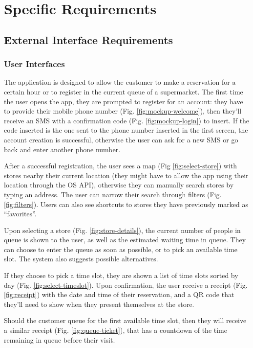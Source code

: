 \section{Specific Requirements}\label{sec:spec_req}

\subsection{External Interface Requirements}
\subsubsection{User Interfaces}

The application is designed to allow the customer to make a reservation for a certain hour or to register in the current queue of a supermarket. The first time the user opens the app, they are prompted to register for an account: they have to provide their mobile phone number
(Fig. \ref{fig:mockup-welcome}), then they'll receive an SMS with a confirmation code
(Fig. \ref{fig:mockup-login}) to insert.
If the code inserted is the one sent to the phone number inserted in the first screen, the account creation is successful, otherwise the user can ask for a new SMS or go back and enter another phone number.

After a successful registration, the user sees a map (Fig \ref{fig:select-store}) with stores nearby their current location (they might have to allow the app using their location through the OS API), otherwise they can manually search stores by typing an address. The user can narrow their search through filters (Fig. \ref{fig:filters}).
Users can also see shortcuts to stores they have previously marked as ``favorites''.

Upon selecting a store (Fig. \ref{fig:store-details}), the current number of people in queue is shown to the user,
as well as the estimated waiting time in queue. They can choose to enter the queue as soon as possible, or to pick an available time slot. The system also suggests possible alternatives.

If they choose to pick a time slot, they are shown a list of time slots sorted by day (Fig. \ref{fig:select-timeslot}).
Upon confirmation, the user receive a receipt (Fig. \ref{fig:receipt}) with the date and time of their reservation,
and a QR code that they'll need to show when they present themselves at the store.

Should the customer queue for the first available time slot, then they will receive a similar receipt (Fig. \ref{fig:queue-ticket}),
that has a countdown of the time remaining in queue before their visit.


